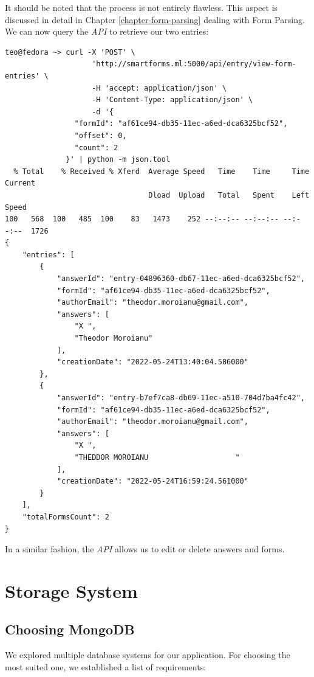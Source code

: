 \documentclass[11pt, a4paper]{report}
\begin{document}
It should be noted that the process is not entirely flawless. This aspect is discussed in  detail in Chapter \ref{chapter-form-parsing} dealing with Form Parsing.
\\


We can now query the \textit{API} to retrieve our two entries:

\begin{verbatim}
teo@fedora ~> curl -X 'POST' \
                    'http://smartforms.ml:5000/api/entry/view-form-entries' \
                    -H 'accept: application/json' \
                    -H 'Content-Type: application/json' \
                    -d '{
                "formId": "af61ce94-db35-11ec-a6ed-dca6325bcf52",
                "offset": 0,
                "count": 2
              }' | python -m json.tool
  % Total    % Received % Xferd  Average Speed   Time    Time     Time  Current
                                 Dload  Upload   Total   Spent    Left  Speed
100   568  100   485  100    83   1473    252 --:--:-- --:--:-- --:--:--  1726
{
    "entries": [
        {
            "answerId": "entry-04896360-db67-11ec-a6ed-dca6325bcf52",
            "formId": "af61ce94-db35-11ec-a6ed-dca6325bcf52",
            "authorEmail": "theodor.moroianu@gmail.com",
            "answers": [
                "X ",
                "Theodor Moroianu"
            ],
            "creationDate": "2022-05-24T13:40:04.586000"
        },
        {
            "answerId": "entry-b7ef7ca8-db69-11ec-a510-704d7ba4fc42",
            "formId": "af61ce94-db35-11ec-a6ed-dca6325bcf52",
            "authorEmail": "theodor.moroianu@gmail.com",
            "answers": [
                "X ",
                "THEDDOR MOROIANU                    "
            ],
            "creationDate": "2022-05-24T16:59:24.561000"
        }
    ],
    "totalFormsCount": 2
}
\end{verbatim}

In a similar fashion, the \textit{API} allows us to edit or delete answers and forms.


\chapter{Storage System}
\label{chapter-storage-system}

\section{Choosing MongoDB}
We explored multiple database systems for our application. For choosing the most suited one, we established a list of requirements:
\end{document}

